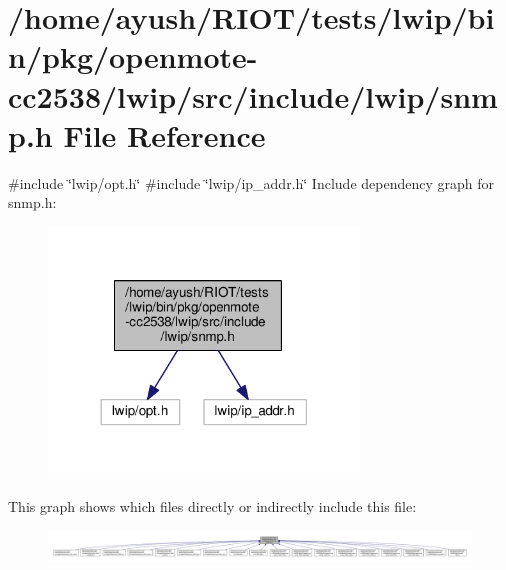 \hypertarget{openmote-cc2538_2lwip_2src_2include_2lwip_2snmp_8h}{}\section{/home/ayush/\+R\+I\+O\+T/tests/lwip/bin/pkg/openmote-\/cc2538/lwip/src/include/lwip/snmp.h File Reference}
\label{openmote-cc2538_2lwip_2src_2include_2lwip_2snmp_8h}
{\ttfamily \#include \char`\"{}lwip/opt.\+h\char`\"{}}\newline
{\ttfamily \#include \char`\"{}lwip/ip\+\_\+addr.\+h\char`\"{}}\newline
Include dependency graph for snmp.\+h\+:
\nopagebreak
\begin{figure}[H]
\begin{center}
\leavevmode
\includegraphics[width=234pt]{openmote-cc2538_2lwip_2src_2include_2lwip_2snmp_8h__incl}
\end{center}
\end{figure}
This graph shows which files directly or indirectly include this file\+:
\nopagebreak
\begin{figure}[H]
\begin{center}
\leavevmode
\includegraphics[width=350pt]{openmote-cc2538_2lwip_2src_2include_2lwip_2snmp_8h__dep__incl}
\end{center}
\end{figure}
